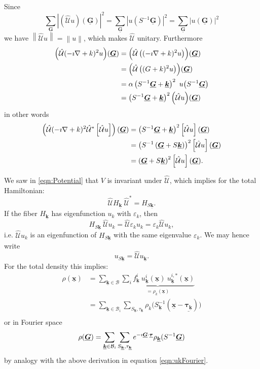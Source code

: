 \documentclass[a4paper]{article}
\newcommand{\I}{\ensuremath \imath}
\renewcommand*{\vec}[1]{\ensuremath{\underline{\boldsymbol{#1}}}}
\newcommand*{\Op}[1]{\ensuremath{\hat{\mathcal{#1}}}}
\newcommand*{\abs}[1]{\ensuremath{\left\lvert#1\right\rvert}}
\newcommand*{\norm}[1]{\ensuremath{\left\lVert#1\right\rVert}}
\begin{document}
Since
\[ \sum_{\vec{G}} \abs{\left( \Op{U} u \right)\!(\vec{G})}^2
	= \sum_{\vec{G}} \abs{u\!\left( S^{-1} \vec{G} \right)}^2
	= \sum_{\vec{G}} \abs{u\!\left(\vec{G} \right)}^2
\]
we have $\norm{\Op{U} u} = \norm{u}$, which makes $\Op{U}$ unitary.
Furthermore
\begin{align*}
	\left( \Op{U} (-\I\nabla + k)^2 u\right)\!(\vec{G})
	&= \left(\Op{U} \left((-\I\nabla + k)^2 u\right)\right)\!(\vec{G}) \\
	&= \left(\Op{U} \left((G + k)^2 u\right)\right)\!(\vec{G}) \\
	&= \alpha \left( S^{-1} \vec{G} + \vec{k} \right)^2
		\  u\!\left( S^{-1} \vec{G} \right)\\
	&= \left( S^{-1} \vec{G} + \vec{k} \right)^2 \left(\Op{U} u\right)\!(\vec{G})
\end{align*}
in other words
\begin{align*}
	\left(\Op{U} (-\I\nabla + k)^2 \Op{U}^\ast \left[\Op{U} u\right]  \right)(\vec{G})
	&= \left( S^{-1} \vec{G} + \vec{k}\right)^2 \left[\Op{U} u\right](\vec{G}) \\
	&= \left( S^{-1} \left(\vec{G} + S\vec{k}\right)\right)^2 \left[\Op{U} u\right](\vec{G}) \\
	&= \left(\vec{G} + S\vec{k}\right)^2 \left[\Op{U} u\right](\vec{G}).
\end{align*}

We saw in \eqref{eqn:Potential} that $V$ is invariant under $\Op{U}$,
which implies for the total Hamiltonian:
\[ \Op{U} H_{\vec{k}} \ \Op{U}^\ast = H_{S\vec{k}}. \]
If the fiber $H_{\vec{k}}$ has eigenfunction $u_k$
with $\varepsilon_k$, then
\[
	H_{S\vec{k}} \ \Op{U} u_k = \Op{U} \varepsilon_k u_k = \varepsilon_k \Op{U} u_k,
\]
i.e. $\Op{U} u_k$ is an eigenfunction of $H_{S\vec{k}}$ with the same
eigenvalue $\varepsilon_k$. We may hence write
\[
	u_{S \vec{k}} = \Op{U} u_{\vec{k}}.
\]
For the total density this implies:
\begin{align*}
	\rho(\vec{x}) &= \sum_{\vec{k} \in \mathcal{B}}
		\underbrace{\sum_{i} f_{\vec{k}}^i \
		u^i_{\vec{k}}(\vec{x}) \ u_{\vec{k}}^{i,\ast}(\vec{x})}_{= \rho_k(\vec{x})} \\
		&= \sum_{\vec{k} \in \mathcal{B}_i}
		\sum_{S_{\vec{k}}, \tau_{\vec{k}}}
		\rho_k\big(S_{\vec{k}}^{-1} (\vec{x} - \vec{\tau_{\vec{k}}})\big) \\
\end{align*}
or in Fourier space
\[ \rho(\vec{G}) = \sum_{\vec{k} \in \mathcal{B}_i} \sum_{S_{\vec{k}}, \tau_{\vec{k}}}
	e^{-\I\vec{G}\cdot\vec{\tau}} \rho_{\vec{k}}(S^{-1}\vec{G})
\]
by analogy with the above derivation in equation \eqref{eqn:ukFourier}.
\end{document}
